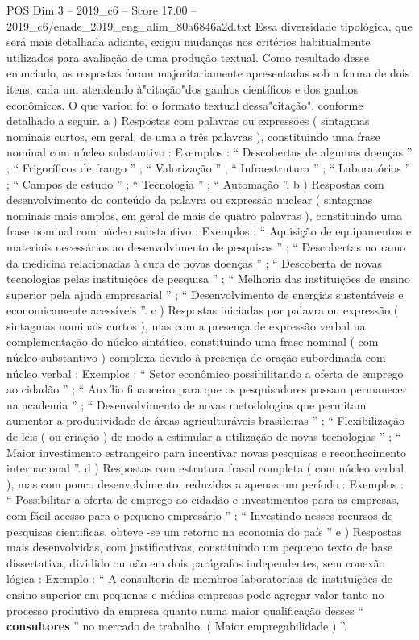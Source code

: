 \begin{textsample}{POS Dim 3 – 2019\_c6 – Score 17.00 – 2019\_c6/enade\_2019\_eng\_alim\_80a6846a2d.txt}
Essa diversidade tipológica, que será mais detalhada adiante, exigiu mudanças nos critérios habitualmente utilizados para avaliação de uma produção textual.
Como resultado desse enunciado, as respostas foram majoritariamente apresentadas sob a forma de dois itens, cada um atendendo à"citação"dos ganhos científicos e dos ganhos econômicos.
O que variou foi o formato textual dessa"citação", conforme detalhado a seguir. a ) Respostas com palavras ou expressões ( sintagmas nominais curtos, em geral, de uma a três palavras ), constituindo uma frase nominal com núcleo substantivo : Exemplos : “ Descobertas de algumas doenças ” ; “ Frigoríficos de frango ” ; “ Valorização ” ; “ Infraestrutura ” ; “ Laboratórios ” ; “ Campos de estudo ” ; “ Tecnologia ” ; “ Automação ”. b ) Respostas com desenvolvimento do conteúdo da palavra ou expressão nuclear ( sintagmas nominais mais amplos, em geral de mais de quatro palavras ), constituindo uma frase nominal com núcleo substantivo : Exemplos : “ Aquisição de equipamentos e materiais necessários ao desenvolvimento de pesquisas ” ; “ Descobertas no ramo da medicina relacionadas à cura de novas doenças ” ; “ Descoberta de novas tecnologias pelas instituições de pesquisa ” ; “ Melhoria das instituições de ensino superior pela ajuda empresarial ” ; “ Desenvolvimento de energias sustentáveis e economicamente acessíveis ”. c ) Respostas iniciadas por palavra ou expressão ( sintagmas nominais curtos ), mas com a presença de expressão verbal na complementação do núcleo sintático, constituindo uma frase nominal ( com núcleo substantivo ) complexa devido à presença de oração subordinada com núcleo verbal : Exemplos : “ Setor econômico possibilitando a oferta de emprego ao cidadão ” ; “ Auxílio financeiro para que os pesquisadores possam permanecer na academia ” ; “ Desenvolvimento de novas metodologias que permitam aumentar a produtividade de áreas agriculturáveis brasileiras ” ; “ Flexibilização de leis ( ou criação ) de modo a estimular a utilização de novas tecnologias ” ; “ Maior investimento estrangeiro para incentivar novas pesquisas e reconhecimento internacional ”. d ) Respostas com estrutura frasal completa ( com núcleo verbal ), mas com pouco desenvolvimento, reduzidas a apenas um período : Exemplos : “ Possibilitar a oferta de emprego ao cidadão e investimentos para as empresas, com fácil acesso para o pequeno empresário ” ; “ Investindo nesses recursos de pesquisas cientificas, obteve -se um retorno na economia do país ” e ) Respostas mais desenvolvidas, com justificativas, constituindo um pequeno texto de base dissertativa, dividido ou não em dois parágrafos independentes, sem conexão lógica : Exemplo : “ A consultoria de membros laboratoriais de instituições de ensino superior em pequenas e médias empresas pode agregar valor tanto no processo produtivo da empresa quanto numa maior qualificação desses “ \textbf{consultores} ” no mercado de trabalho. ( Maior empregabilidade ) ”.

\end{textsample}
